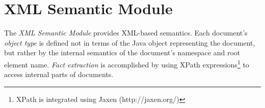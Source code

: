 \documentclass[10pt,letterpaper]{article}
\begin{document}
\section{XML Semantic Module}

The \emph{XML Semantic Module} provides XML-based semantics.
Each document's \emph{object type} is defined not in terms
of the Java object representing the document, but rather by the
internal semantics of the document's namespace and root element
name. \emph{Fact extraction} is accomplished by using XPath
expressions\footnote{XPath is integrated using Jaxen
(http://jaxen.org/)} to access internal parts of documents.




\end{document}
